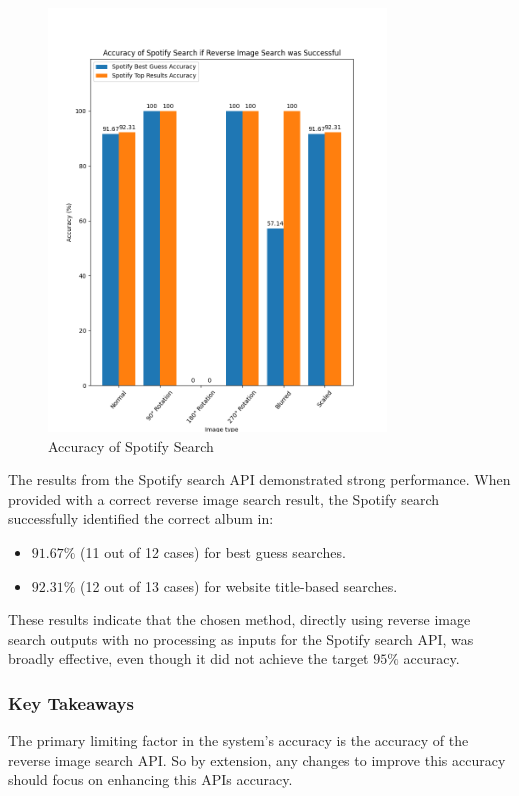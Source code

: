 \begin{figure} [H]
    \centering
    \includegraphics[width=0.8\textwidth]{figures/evaluation_graphs_spotify.png}
    \caption{Accuracy of Spotify Search}
    \label{fig:album-scanning-results-spotify}
\end{figure}

The results from the Spotify search API demonstrated strong performance. When provided with a correct reverse image search result, the Spotify search successfully identified the correct album in:

\begin{itemize}
    \item $91.67\%$ (11 out of 12 cases) for best guess searches.
    \item $92.31\%$ (12 out of 13 cases) for website title-based searches.
\end{itemize}

These results indicate that the chosen method, directly using reverse image search outputs with no processing as inputs for the Spotify search API, was broadly effective, even though it did not achieve the target $95\%$ accuracy.

\subsubsection{Key Takeaways}
The primary limiting factor in the system's accuracy is the accuracy of the reverse image search API. So by extension, any changes to improve this accuracy should focus on enhancing this APIs accuracy.

